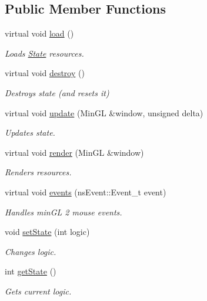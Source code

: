 \subsection*{Public Member Functions}
\begin{DoxyCompactItemize}
\item 
virtual void \hyperlink{structns_game_1_1_state_a8644de505f7a84933f6d6e6651205791}{load} ()
\begin{DoxyCompactList}\small\item\em Loads \hyperlink{structns_game_1_1_state}{State} resources. \end{DoxyCompactList}\item 
virtual void \hyperlink{structns_game_1_1_state_a70a0cf146071a8f9fcb8ca0b2c0f8f44}{destroy} ()
\begin{DoxyCompactList}\small\item\em Destroys state (and resets it) \end{DoxyCompactList}\item 
virtual void \hyperlink{structns_game_1_1_state_ae809e89ac9df4a43ab90d5d5932e2bc7}{update} (Min\+GL \&window, unsigned delta)
\begin{DoxyCompactList}\small\item\em Updates state. \end{DoxyCompactList}\item 
virtual void \hyperlink{structns_game_1_1_state_a214f8ee52de4b318f1ed3861a578ce67}{render} (Min\+GL \&window)
\begin{DoxyCompactList}\small\item\em Renders resources. \end{DoxyCompactList}\item 
virtual void \hyperlink{structns_game_1_1_state_a2e1daaca20e580bdb4baf8215e1b51c9}{events} (ns\+Event\+::\+Event\+\_\+t event)
\begin{DoxyCompactList}\small\item\em Handles min\+GL 2 mouse events. \end{DoxyCompactList}\item 
void \hyperlink{structns_game_1_1_state_adab442cc7a1edda5adaa55e8d510633f}{set\+State} (int logic)
\begin{DoxyCompactList}\small\item\em Changes logic. \end{DoxyCompactList}\item 
int \hyperlink{structns_game_1_1_state_abcc65369e15769b5c6ae588f61beeb02}{get\+State} ()
\begin{DoxyCompactList}\small\item\em Gets current logic. \end{DoxyCompactList}\end{DoxyCompactItemize}
